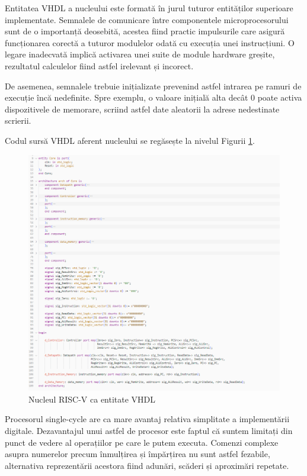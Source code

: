\documentclass[12pt]{article}
\begin{document}
Entitatea VHDL a nucleului este formată în jurul tuturor entităților superioare implementate. Semnalele de comunicare între componentele microprocesorului sunt de o importanță deosebită, acestea fiind practic impulsurile care asigură funcționarea corectă a tuturor modulelor odată cu execuția unei instrucțiuni. O legare inadecvată implică activarea unei suite de module hardware greșite, rezultatul calculelor fiind astfel irelevant și incorect.
 
De asemenea, semnalele trebuie inițializate prevenind astfel intrarea pe ramuri de execuție încă nedefinite. Spre exemplu, o valoare inițială alta decât 0 poate activa dispozitivele de memorare, scriind astfel date aleatorii la adrese nedestinate scrierii.

Codul sursă VHDL aferent nucleului se regăsește la nivelul Figurii \ref{Figura:53}.
\newpage
  \begin{figure}[h!]
 \includegraphics[width=1.0\textwidth]{riscvcore.png}
 \centering
 \caption{Nucleul RISC-V ca entitate VHDL}
 \label{Figura:53}
 \end{figure}
 
 
Procesorul single-cycle are ca mare avantaj relativa simplitate a implementării digitale.  Dezavantajul unui astfel de procesor este faptul că suntem limitați din punct de vedere al operațiilor pe care le putem executa. Comenzi complexe asupra numerelor precum înmulțirea și împărțirea nu sunt astfel fezabile, alternativa reprezentării acestora fiind adunări, scăderi și aproximări repetate.
\end{document}
